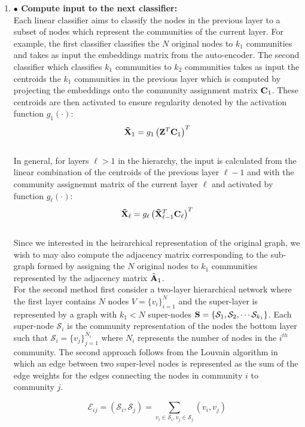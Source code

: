 \documentclass[a4paper,12pt]{article}
\begin{document}
\begin{itemize}
\begin{enumerate}
{\begin{enumerate}
				\item[]{\textbf{$\bullet$ Compute input to the next classifier:}  \\
					Each linear classifier aims to classify the nodes in the previous layer to a subset of nodes which represent the communities of the current layer. For example, the first classifier classifies the $N$ original nodes to $k_1$ communities and takes as input the embeddings matrix from the auto-encoder. The second classifier which classifies $k_1$ communities to $k_2$ communities takes as input the centroids the $k_1$ communities in the previous layer which is computed by projecting the embeddings onto the community assignment matrix ${\bf C}_1$. These centroids are then activated to ensure regularity denoted by the activation function $g_1(\cdot)$:
					\[ {\bf \tilde X}_{1} = g_1\left({\bf Z}^T {\bf C}_{1}\right)^T\] 
					\\
					In general, for layers $\ell > 1$ in the hierarchy, the input is calculated from the linear combination of the centroids of the previous layer $\ell - 1$ and with the community assignemnt matrix of the current layer $\ell$ and activated by function $g_\ell(\cdot)$: 
					\[ {\bf \tilde X}_{\ell} = g_\ell\left({\bf \tilde{X}}_{\ell-1}^T {\bf C}_{\ell}\right)^T\] 
					\\
					
					Since we interested in the heirarchical representation of the original graph, we wish to  may also compute the adjacency matrix corresponding to the sub-graph formed by assigning the $N$ original nodes to $k_1$ communities represented by the adjacency matrix $\tilde{\bf A}_1$.\\
				
					For the second method first consider a two-layer hierarchical network where the first layer contains $N$ nodes $V = \{v_i\}_{i=1}^N$ and the super-layer is represented by a graph with $k_1<N$ super-nodes $\mathcal{\bf S} = \{\mathcal{S}_1, \mathcal{S}_2, \cdots \mathcal{S}_{k_1}\}$. Each super-node $\mathcal{S}_i$ is the community representation of the nodes the bottom layer such that $\mathcal{S}_i = \{v_j\}_{j=1}^{N_i}$ where $N_i$ represents the number of nodes in the $i^{th}$ community. The second approach follows from the Louvain algorithm \cite{blondel2008fast} in which an edge between two super-level nodes is represented as the sum of the edge weights for the edges connecting the nodes in community $i$ to community $j$. 
						
					\[\mathcal{E}_{ij} = (\mathcal{S}_i, \mathcal{S}_j) = \sum_{v_i \in \mathcal{S}_i, v_j \in \mathcal{S}_j}  (v_i, v_j) \]
						
}
\end{enumerate}}
\end{enumerate}
\end{itemize}
\end{document}
